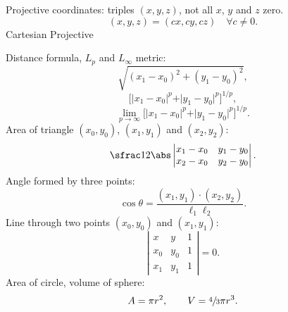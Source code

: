 Projective coordinates: triples $(x,y,z)$,
not all $x$, $y$ and $z$ zero.
$$(x,y,z) = (cx,cy,cz) \quad \forall c \neq 0.$$
Cartesian \qquad Projective
\Hrule
{}

Distance formula, $L_p$ and $L_\infty$ metric:
$$
\sqrt{(x_1 - x_0)^2 + (y_1 - y_0)^2},
$$
$$
\big[ \vert x_1 - x_0 \vert^p + \vert y_1 - y_0 \vert^p \big]^{1/p},
$$
$$
\lim_{p \to \infty} \big[ \vert x_1 - x_0 \vert^p + \vert y_1 - y_0 \vert^p \big]^{1/p}.
$$
Area of triangle $(x_0,y_0)$, $(x_1,y_1)$ and $(x_2,y_2)$:
$$
\sfrac 1 2
\abs
\left\vert \begin{matrix}
x_1-x_0 &y_1-y_0  \\
x_2-x_0 &y_2-y_0
\end{matrix}\right\vert.
$$
Angle formed by three points:
\vskip3pt
$$
\cos \theta = \frac{(x_1, y_1) \cdot (x_2, y_2)}{\ell_1 \ell_2}.
$$
Line through two points $(x_0,y_0)$ and $(x_1,y_1)$:
$$
\left\vert \begin{matrix}
x &y & 1\\
x_0 &y_0 & 1\\
x_1 &y_1 & 1
\end{matrix}\right\vert = 0.
$$
Area of circle, volume of sphere:
$$ A= \pi r^2, \qquad V= \sfrac 4 3 \pi r^3.$$
